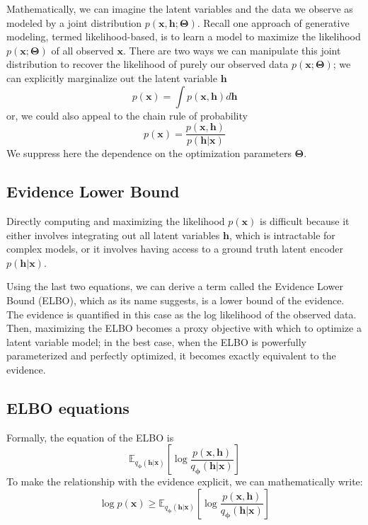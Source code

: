 \documentclass[%
oneside,                 %
final,                   %
10pt]{article}
\begin{document}
Mathematically, we can imagine the latent variables and the data we
observe as modeled by a joint distribution $p(\bm{x}, \bm{h};\bm{\Theta})$.  Recall one
approach of generative modeling, termed likelihood-based, is to
learn a model to maximize the likelihood $p(\bm{x};\bm{\Theta})$ of all observed
$\bm{x}$.  There are two ways we can manipulate this joint distribution
to recover the likelihood of purely our observed data $p(\bm{x};\bm{\Theta})$; we can
explicitly marginalize
out the latent variable $\bm{h}$
\begin{equation*}
p(\bm{x}) = \int p(\bm{x}, \bm{h})d\bm{h}
\end{equation*}
or, we could also appeal to the chain rule of probability
\begin{equation*}
p(\bm{x}) = \frac{p(\bm{x}, \bm{h})}{p(\bm{h}|\bm{x})}
\end{equation*}
We suppress here the dependence	on the optimization parameters $\bm{\Theta}$.

\subsection{Evidence Lower Bound}
Directly computing and maximizing the likelihood $p(\bm{x})$ is
difficult because it either involves integrating out all latent
variables $\bm{h}$, which is intractable for
complex models, or it involves having access to a ground truth latent
encoder $p(\bm{h}|\bm{x})$.

Using the last  two equations, we can derive a term called the Evidence Lower Bound (ELBO), which as its name suggests, is a lower
  bound of the evidence.  The evidence is quantified in this case as
the log likelihood of the observed data.  Then, maximizing the ELBO
becomes a proxy objective with which to optimize a latent variable
model; in the best case, when the ELBO is powerfully parameterized and
perfectly optimized, it becomes exactly equivalent to the evidence.

\subsection{ELBO equations}
Formally, the equation of the ELBO is
\begin{equation*}
\mathbb{E}_{q_{\bm{\phi}}(\bm{h}|\bm{x})}\left[\log\frac{p(\bm{x}, \bm{h})}{q_{\bm{\phi}}(\bm{h}|\bm{x})}\right]
\end{equation*}
To make the relationship with the evidence explicit, we can mathematically write:
\begin{equation*}
\log p(\bm{x}) \geq \mathbb{E}_{q_{\bm{\phi}}(\bm{h}|\bm{x})}\left[\log\frac{p(\bm{x}, \bm{h})}{q_{\bm{\phi}}(\bm{h}|\bm{x})}\right]
\end{equation*}
\end{document}
